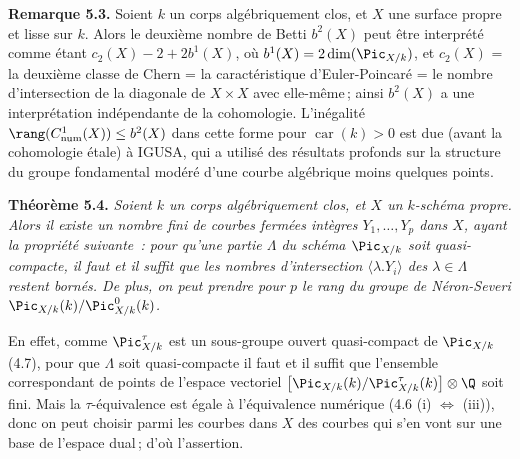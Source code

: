 
\textbf{Remarque 5.3.} Soient \(k\) un corps alg\'ebriquement clos, et \(X\) une surface propre et lisse sur \(k\). Alors le deuxi\`eme nombre de Betti \(b^2(X)\) peut \^etre interpr\'et\'e comme \'etant \(c_2(X)-2+2b^1(X)\), o\`u \(b^1(X)=2\dim(\Pic_{X/k})\), et \(c_2(X)\) = la deuxi\`eme classe de Chern = la caract\'eristique d'Euler-Poincar\'e = le nombre d'intersection de la diagonale de \(X\times X\) avec elle-m\^eme\,; ainsi \(b^2(X)\) a une interpr\'etation ind\'ependante de la cohomologie. L'in\'egalit\'e \(\rang(C^1_{\rm num}(X))\le b^2(X)\) dans cette forme pour \(\operatorname{car}(k)>0\) est due (avant la cohomologie \'etale) \`a IGUSA, qui a utilis\'e des r\'esultats profonds sur la structure du groupe fondamental mod\'er\'e d'une courbe alg\'ebrique moins quelques points.

\textbf{Th\'eor\`eme 5.4.} \emph{Soient \(k\) un corps alg\'ebriquement clos, et \(X\) un \(k\)-sch\'ema propre. Alors il existe un nombre fini de courbes ferm\'ees int\`egres \(Y_1,\ldots,Y_p\) dans \(X\), ayant la propri\'et\'e suivante~: pour qu'une partie \(\Lambda\) du sch\'ema \(\Pic_{X/k}\) soit quasi-compacte, il faut et il suffit que les nombres d'intersection \(\langle\lambda.Y_i\rangle\) des \(\lambda\in\Lambda\) restent born\'es. De plus, on peut prendre pour \(p\) le rang du groupe de N\'eron-Severi \(\Pic_{X/k}(k)/\Pic^0_{X/k}(k)\).}

En effet, comme \(\Pic^\tau_{X/k}\) est un sous-groupe ouvert quasi-compact de \(\Pic_{X/k}\) (4.7), pour que \(\Lambda\) soit quasi-compacte il faut et il suffit que l'ensemble correspondant de points de l'espace vectoriel \(\bigl[\Pic_{X/k}(k)/\Pic^\tau_{X/k}(k)\bigr]\otimes\Q\) soit fini. Mais la \(\tau\)-\'equivalence est \'egale \`a l'\'equivalence num\'erique (4.6 (i) \(\Longleftrightarrow\) (iii)), donc on peut choisir parmi les courbes dans \(X\) des courbes qui s'en vont sur une base de l'espace dual\,; d'o\`u l'assertion.

